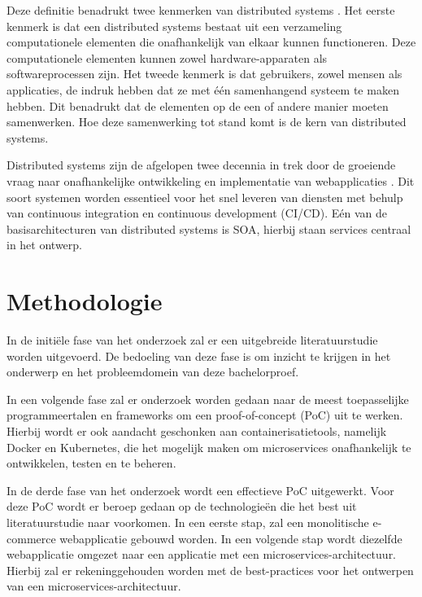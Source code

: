 Deze definitie benadrukt twee kenmerken van distributed systems \autocite{Steen2018}. Het eerste kenmerk is dat een distributed systems bestaat uit een verzameling computationele elementen die onafhankelijk van elkaar kunnen functioneren. Deze computationele elementen kunnen zowel hardware-apparaten als softwareprocessen zijn. Het tweede kenmerk is dat gebruikers, zowel mensen als applicaties, de indruk hebben dat ze met één samenhangend systeem te maken hebben. Dit benadrukt dat de elementen op de een of andere manier moeten samenwerken. Hoe deze samenwerking tot stand komt is de kern van distributed systems.

Distributed systems zijn de afgelopen twee decennia in trek door de groeiende vraag naar onafhankelijke ontwikkeling en implementatie van webapplicaties \autocite{Raj2021}. Dit soort systemen worden essentieel voor het snel leveren van diensten met behulp van continuous integration en continuous development (CI/CD). Eén van de basisarchitecturen van distributed systems is SOA, hierbij staan services centraal in het ontwerp.



\section{Methodologie}%
\label{sec:methodologie}

In de initiële fase van het onderzoek zal er een uitgebreide literatuurstudie worden uitgevoerd. De bedoeling van deze fase is om inzicht te krijgen in het onderwerp en het probleemdomein van deze bachelorproef.

In een volgende fase zal er onderzoek worden gedaan naar de meest toepasselijke programmeertalen en frameworks om een proof-of-concept (PoC) uit te werken. Hierbij wordt er ook aandacht geschonken aan containerisatietools, namelijk Docker en Kubernetes, die het mogelijk maken om microservices onafhankelijk te ontwikkelen, testen en te beheren.

In de derde fase van het onderzoek wordt een effectieve PoC uitgewerkt. Voor deze PoC wordt er beroep gedaan op de technologieën die het best uit literatuurstudie naar voorkomen. In een eerste stap, zal een monolitische e-commerce webapplicatie gebouwd worden. In een volgende stap wordt diezelfde webapplicatie omgezet naar een applicatie met een microservices-architectuur. Hierbij zal er rekeninggehouden worden met de best-practices voor het ontwerpen van een microservices-architectuur.

